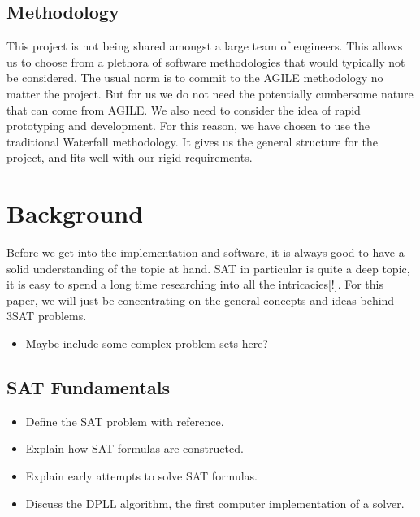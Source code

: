 \documentclass{article}
\begin{document}

\subsection{Methodology}
This project is not being shared amongst a large team of engineers. This allows us to choose from a plethora of software methodologies that would typically not be considered. The usual norm is to commit to the AGILE methodology no matter the project. But for us we do not need the potentially cumbersome nature that can come from AGILE. We also need to consider the idea of rapid prototyping and development. For this reason, we have chosen to use the traditional Waterfall methodology. It gives us the general structure for the project, and fits well with our rigid requirements.

\section{Background}
Before we get into the implementation and software, it is always good to have a solid understanding
of the topic at hand. SAT in particular is quite a deep topic, it is easy to spend a long time
researching into all the intricacies[!]. For this paper, we will just be concentrating on the
general concepts and ideas behind 3SAT problems.

\begin{itemize}
    \item Maybe include some complex problem sets here?
\end{itemize}


\subsection{SAT Fundamentals}
\begin{itemize}
    \item Define the SAT problem with reference.
    \item Explain how SAT formulas are constructed.
    \item Explain early attempts to solve SAT formulas.
    \item Discuss the DPLL algorithm, the first computer implementation of a solver.
\end{itemize}
\end{document}
